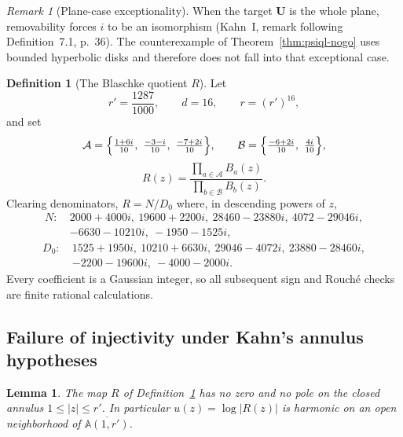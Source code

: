 \documentclass[11pt,reqno]{amsart}
\newtheorem{lemma}[theorem]{Lemma}
\theoremstyle{definition}
\newtheorem{definition}[theorem]{Definition}
\theoremstyle{remark}
\newtheorem{remark}[theorem]{Remark}
\begin{document}
\begin{remark}[Plane-case exceptionality]\label{rem:plane-case}
When the target \(\mathbf U\) is the whole plane, removability forces \(i\) to be an isomorphism (Kahn~I, remark following Definition~7.1, p.~36). The counterexample of Theorem~\ref{thm:psiql-nogo} uses bounded hyperbolic disks and therefore does not fall into that exceptional case.
\end{remark}

\begin{definition}[The Blaschke quotient \(R\)]\label{def:blaschke-quotient}
Let
\[ r'=\frac{1287}{1000},\qquad d=16,\qquad r=(r')^{16}, \]
and set
\[ \mathcal A=\Bigl\{\tfrac{1+6i}{10},\ \tfrac{-3-i}{10},\ \tfrac{-7+2i}{10}\Bigr\},\qquad \mathcal B=\Bigl\{\tfrac{-6+2i}{10},\ \tfrac{4i}{10}\Bigr\}, \]
\[ R(z)=\frac{\prod_{a\in\mathcal A}B_a(z)}{\prod_{b\in\mathcal B}B_b(z)}. \tag{A.1} \]
Clearing denominators, \(R=N/D_0\) where, in descending powers of \(z\),
\[\begin{aligned} N:\ & 2000+4000i,\ 19600+2200i,\ 28460-23880i,\ 4072-29046i,\\ &-6630-10210i,\ -1950-1525i, \end{aligned}\tag{A.2}\]
\[\begin{aligned} D_0:\ & 1525+1950i,\ 10210+6630i,\ 29046-4072i,\ 23880-28460i,\\ &-2200-19600i,\ -4000-2000i. \end{aligned}\tag{A.3}\]
Every coefficient is a Gaussian integer, so all subsequent sign and Rouch\'e checks are finite rational calculations.
\end{definition}

\subsection{Failure of injectivity under Kahn's annulus hypotheses}
\begin{lemma}\label{lem:avoid}
The map \(R\) of Definition~\ref{def:blaschke-quotient} has no zero and no pole on the closed annulus \(1\le|z|\le r'\). In particular \(u(z)=\log|R(z)|\) is harmonic on an open neighborhood of \(\overline{\mathbb A(1,r')}\).
\end{lemma}
\end{document}
